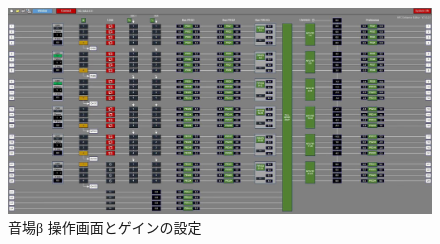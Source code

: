 \documentclass[11pt,a4j]{jreport}
\begin{document}

\newpage

\begin{figure}[H]
  \centering
  \includegraphics[width=.9\linewidth]{images/experimentField/afcParameters/02beta/01overall.jpg}
  \caption{音場β 操作画面とゲインの設定}
  \label{fig:beta操作画面}
\end{figure}
\end{document}
